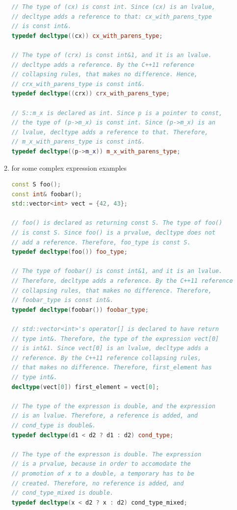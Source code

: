 \documentclass[a4paper,12pt,twoside]{book}
\begin{document}
\begin{itemize}
\begin{enumerate}
\begin{lstlisting}[frame=single, language=c++]
// The type of (cx) is const int. Since (cx) is an lvalue,
// decltype adds a reference to that: cx_with_parens_type
// is const int&.
typedef decltype((cx)) cx_with_parens_type;

// The type of (crx) is const int&1, and it is an lvalue.
// decltype adds a reference. By the C++11 reference
// collapsing rules, that makes no difference. Hence,
// crx_with_parens_type is const int&.
typedef decltype((crx)) crx_with_parens_type;

// S::m_x is declared as int. Since p is a pointer to const,
// the type of (p->m_x) is const int. Since (p->m_x) is an
// lvalue, decltype adds a reference to that. Therefore,
// m_x_with_parens_type is const int&.
typedef decltype((p->m_x)) m_x_with_parens_type;
\end{lstlisting}
\item for some complex expression examples
\begin{lstlisting}[frame=single, language=c++]
const S foo();
const int& foobar();
std::vector<int> vect = {42, 43};

// foo() is declared as returning const S. The type of foo()
// is const S. Since foo() is a prvalue, decltype does not
// add a reference. Therefore, foo_type is const S.
typedef decltype(foo()) foo_type;

// The type of foobar() is const int&1, and it is an lvalue. 
// Therefore, decltype adds a reference. By the C++11 reference
// collapsing rules, that makes no difference. Therefore,
// foobar_type is const int&.
typedef decltype(foobar()) foobar_type;

// std::vector<int>'s operator[] is declared to have return
// type int&. Therefore, the type of the expression vect[0]
// is int&1. Since vect[0] is an lvalue, decltype adds a
// reference. By the C++11 reference collapsing rules,
// that makes no difference. Therefore, first_element has
// type int&.  
decltype(vect[0]) first_element = vect[0];

// The type of the expresson is double, and the expression
// is an lvalue. Therefore, a reference is added, and
// cond_type is double&.
typedef decltype(d1 < d2 ? d1 : d2) cond_type;

// The type of the expresson is double. The expression
// is a prvalue, because in order to accomodate the
// promotion of x to a double, a temporary has to be
// created. Therefore, no reference is added, and
// cond_type_mixed is double.
typedef decltype(x < d2 ? x : d2) cond_type_mixed;
\end{lstlisting}
		

\end{enumerate}
\end{itemize}
\end{document}
